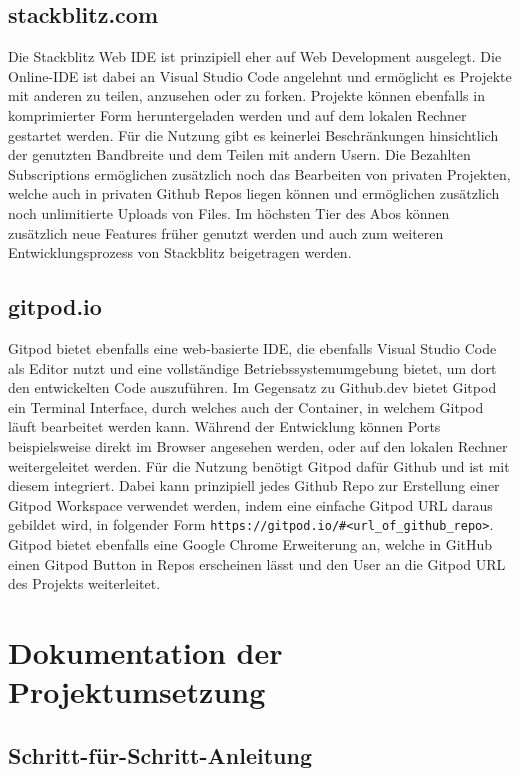 \subsection{stackblitz.com}
Die Stackblitz Web IDE ist prinzipiell eher auf Web Development ausgelegt. Die Online-IDE ist dabei an Visual Studio Code angelehnt und ermöglicht es Projekte mit anderen zu teilen, anzusehen oder zu forken. Projekte können ebenfalls in komprimierter Form heruntergeladen werden und auf dem lokalen Rechner gestartet werden.
Für die Nutzung gibt es keinerlei Beschränkungen hinsichtlich der genutzten Bandbreite und dem Teilen mit andern Usern. Die Bezahlten Subscriptions ermöglichen zusätzlich noch das Bearbeiten von privaten Projekten, welche auch in privaten Github Repos liegen können und ermöglichen zusätzlich noch unlimitierte Uploads von Files. Im höchsten Tier des Abos können zusätzlich neue Features früher genutzt werden und auch zum weiteren Entwicklungsprozess von Stackblitz beigetragen werden. 


\subsection{gitpod.io}
Gitpod bietet ebenfalls eine web-basierte IDE, die ebenfalls Visual Studio Code als Editor nutzt und eine vollständige Betriebssystemumgebung bietet, um dort den entwickelten Code auszuführen. Im Gegensatz zu Github.dev bietet Gitpod ein Terminal Interface, durch welches auch der Container, in welchem Gitpod läuft bearbeitet werden kann.
Während der Entwicklung können Ports beispielsweise direkt im Browser
angesehen werden, oder auf den lokalen Rechner weitergeleitet werden.
Für die Nutzung benötigt Gitpod dafür Github und ist mit diesem integriert. Dabei kann prinzipiell jedes Github Repo zur Erstellung einer Gitpod Workspace verwendet werden, indem eine einfache Gitpod URL daraus gebildet wird, in folgender Form \verb|https://gitpod.io/#<url_of_github_repo>|. Gitpod bietet ebenfalls eine Google Chrome Erweiterung an, welche in GitHub einen Gitpod Button in Repos erscheinen lässt und den User an die Gitpod URL des Projekts weiterleitet.

\clearpage
\section{Dokumentation der Projektumsetzung}

\subsection{Schritt-für-Schritt-Anleitung}

